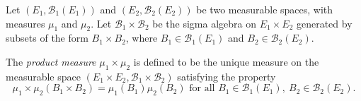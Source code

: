 \documentclass[12pt]{article}
\begin{document}
Let $(E_1, \mathcal{B}_1(E_1))$ and $(E_2, \mathcal{B}_2(E_2))$ be two measurable spaces, with measures $\mu_1$ and $\mu_2$. Let $\mathcal{B}_1 \times \mathcal{B}_2$ be the sigma algebra on $E_1 \times E_2$ generated by subsets of the form $B_1 \times B_2$, where $B_1 \in \mathcal{B}_1(E_1)$ and $B_2 \in \mathcal{B}_2(E_2)$.

The {\em product measure} $\mu_1 \times \mu_2$ is defined to be the unique measure on the measurable space $(E_1 \times E_2, \mathcal{B}_1 \times \mathcal{B}_2)$ satisfying the property
$$
\mu_1 \times \mu_2(B_1 \times B_2) = \mu_1(B_1) \mu_2(B_2) \text{\ for all\ } B_1 \in \mathcal{B}_1(E_1),\ B_2 \in \mathcal{B}_2(E_2).
$$
\end{document}
